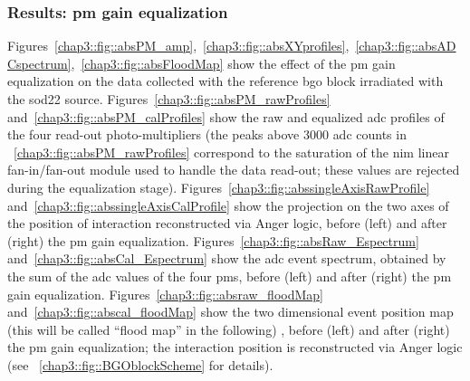 \subsubsection{Results: \gls{pm} gain equalization}\label{chap3::subsubsec::absPMgainCal}
Figures~\ref{chap3::fig::absPM_amp},~\ref{chap3::fig::absXYprofiles},~\ref{chap3::fig::absADCspectrum},~\ref{chap3::fig::absFloodMap} show the effect of the \gls{pm} gain equalization on the data collected with the reference \gls{bgo} block irradiated with the \gls{sod22} source.
Figures~\ref{chap3::fig::absPM_rawProfiles} and~\ref{chap3::fig::absPM_calProfiles} show the raw and equalized \gls{adc} profiles of the four read-out photo-multipliers (the peaks above 3000 \gls{adc} counts in \figurename~\ref{chap3::fig::absPM_rawProfiles} correspond to the saturation of the \gls{nim} linear fan-in/fan-out module used to handle the data read-out; these values are rejected during the equalization stage).
Figures~\ref{chap3::fig::abssingleAxisRawProfile} and~\ref{chap3::fig::abssingleAxisCalProfile} show the projection on the two axes of the position of interaction reconstructed via Anger logic, before (left) and after (right) the \gls{pm} gain equalization.
Figures~\ref{chap3::fig::absRaw_Espectrum} and~\ref{chap3::fig::absCal_Espectrum} show the \gls{adc} event spectrum, obtained by the sum of the \gls{adc} values of the four \glspl{pm}, before (left) and after (right) the \gls{pm} gain equalization.
Figures~\ref{chap3::fig::absraw_floodMap} and~\ref{chap3::fig::abscal_floodMap} show the two dimensional event position map (this will be called \enquote{flood map} in the following) , before (left) and after (right) the \gls{pm} gain equalization; the interaction position is reconstructed via Anger logic (see \figurename~\ref{chap3::fig::BGOblockScheme} for details).

